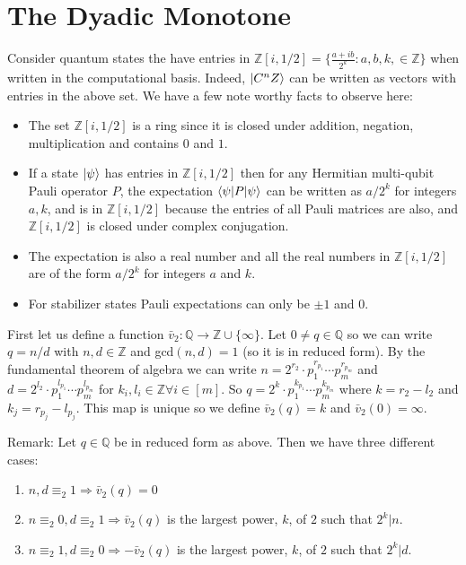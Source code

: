 \documentclass[12pt]{dalthesis}
\begin{document}
\section{The Dyadic Monotone}
Consider quantum states the have entries in $\mathbb{Z}[i, 1/2] = \big\{\frac{a+ib}{2^k}: a, b, k, \in \mathbb{Z} \big\}$ when written in the computational basis. Indeed, $\ket{C^nZ}$ can be written as vectors with entries in the above set. We have a few note worthy facts to observe here:
\begin{itemize}
\item The set $\mathbb{Z}[i, 1/2]$ is a ring since it is closed under addition, negation, multiplication and contains $0$ and $1$.
\item If a state $\ket{\psi}$ has entries in $\mathbb{Z}[i, 1/2]$ then for any Hermitian multi-qubit Pauli operator $P$, the expectation $\braket{\psi | P | \psi}$ can be written as $a/2^k$ for integers $a, k$, and is in $\mathbb{Z}[i, 1/2]$ because the entries of all Pauli matrices are also, and $\mathbb{Z}[i, 1/2]$ is closed under complex conjugation.
\item The expectation is also a real number and all the real numbers in $\mathbb{Z}[i, 1/2]$ are of the form $a/2^k$ for integers $a$ and $k$. 
\item For stabilizer states Pauli expectations can only be $\pm 1$ and $0$.
\end{itemize}

First let us define a function $\bar{v}_2 :\mathbb{Q} \rightarrow \mathbb{Z} \cup \{ \infty \}$. Let $0 \neq q \in \mathbb{Q}$ so we can write $q = n/d$ with $n, d \in \mathbb{Z}$ and gcd$(n, d) = 1$ (so it is in reduced form). By the fundamental theorem of algebra we can write $n = 2^{r_2} \cdot p^{r_{p_1}}_1 \cdots p^{r_{p_m}}_m$ and $d = 2^{l_2} \cdot p^{l_{p_1}}_1 \cdots p^{l_{p_m}}_m$ for $k_i, l_i \in \mathbb{Z} \forall i \in [m]$. So $q = 2^{k} \cdot p^{k_{p_1}}_1 \cdots p^{k_{p_m}}_m$ where $k = r_2 - l_2$ and $k_j = r_{p_j} - l_{p_j}$. This map is unique so we define $\bar{v}_2(q) = k$ and $\bar{v}_2(0) = \infty$.

Remark: Let $q \in \mathbb{Q}$ be in reduced form as above. Then we have three different cases:
\begin{enumerate}
\item $n, d \equiv_2 1 \Rightarrow \bar{v}_2(q)= 0$
\item $n \equiv_2 0, d \equiv_2 1 \Rightarrow \bar{v}_2(q)$ is the largest power, $k$, of $2$ such that $2^k|n$.
\item $n \equiv_2 1, d \equiv_2 0 \Rightarrow -\bar{v}_2(q)$ is the largest power, $k$, of $2$ such that $2^k|d$.
\end{enumerate}
\end{document}
